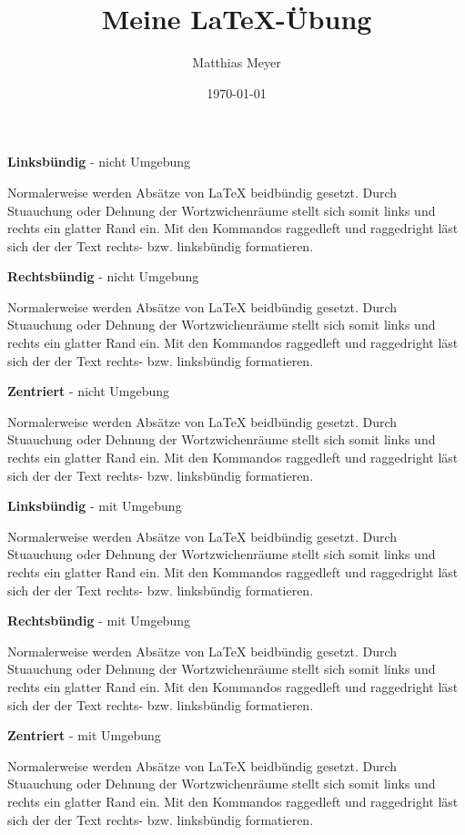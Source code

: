 \documentclass[a4paper,twoside,10pt]{article}
\author{Matthias Meyer}
\title{Meine LaTeX-Übung}
\date{\today}
\begin{document}
\textbf{Linksbündig} - nicht Umgebung

\raggedright Normalerweise werden Absätze von LaTeX beidbündig gesetzt. Durch Stuauchung oder Dehnung der Wortzwichenräume stellt sich somit links und rechts ein glatter Rand ein. \footnotesize Mit den Kommandos raggedleft und raggedright läst sich der der Text rechts- bzw. linksbündig formatieren.

\justifying
\textbf{Rechtsbündig} - nicht Umgebung

\large \raggedleft Normalerweise werden Absätze von LaTeX beidbündig gesetzt. Durch Stuauchung oder Dehnung der Wortzwichenräume stellt sich somit links und rechts ein glatter Rand ein. Mit den Kommandos raggedleft und raggedright läst sich der der Text rechts- bzw. linksbündig formatieren.

\justifying
\textbf{Zentriert} - nicht Umgebung

\centering Normalerweise werden Absätze von LaTeX beidbündig gesetzt. Durch Stuauchung oder Dehnung der Wortzwichenräume stellt sich somit links und rechts ein glatter Rand ein. Mit den Kommandos raggedleft und raggedright läst sich der der Text rechts- bzw. linksbündig formatieren.

\justifying
\textbf{Linksbündig} - mit Umgebung

\begin{flushleft}
    Normalerweise werden Absätze von LaTeX beidbündig gesetzt. Durch Stuauchung oder Dehnung der Wortzwichenräume stellt sich somit links und rechts ein glatter Rand ein. Mit den Kommandos raggedleft und raggedright läst sich der der Text rechts- bzw. linksbündig formatieren.
\end{flushleft}

\textbf{Rechtsbündig} - mit Umgebung

\begin{flushright}
    Normalerweise werden Absätze von LaTeX beidbündig gesetzt. Durch Stuauchung oder Dehnung der Wortzwichenräume stellt sich somit links und rechts ein glatter Rand ein. Mit den Kommandos raggedleft und raggedright läst sich der der Text rechts- bzw. linksbündig formatieren.
\end{flushright}

\textbf{Zentriert} - mit Umgebung

\begin{center}
    \LARGE Normalerweise werden Absätze von LaTeX beidbündig gesetzt. Durch Stuauchung oder Dehnung der Wortzwichenräume stellt sich somit links und rechts ein glatter Rand ein. Mit den Kommandos raggedleft und raggedright läst sich der der Text rechts- bzw. linksbündig formatieren.
\end{center}
\end{document}

